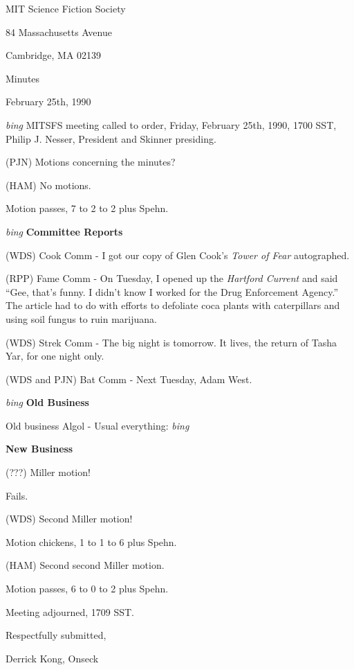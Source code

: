 \setlength{\topmargin}{-0.5in}
\setlength{\oddsidemargin}{0.0in}
\setlength{\evensidemargin}{0.0in}
\setlength{\textheight}{9in}
\setlength{\textwidth}{6.5in}



\begin{center}
MIT Science Fiction Society

84 Massachusetts Avenue

Cambridge, MA 02139

\vspace{0.2in}
Minutes

February 25th, 1990

\end{center}
 
\vspace{0.15in}
{\em bing\/}  MITSFS meeting called to order, Friday, February 25th, 1990,
1700 SST, Philip J. Nesser, President and Skinner presiding.

(PJN) Motions concerning the minutes?

(HAM) No motions.

Motion passes, 7 to 2 to 2 plus Spehn.

\vspace{0.15in}
{\em bing\/} {\bf Committee Reports}

(WDS) Cook Comm - I got our copy of Glen Cook's {\em Tower of Fear}
autographed.

(RPP) Fame Comm - On Tuesday, I opened up the {\em Hartford Current}
and said ``Gee, that's funny.  I didn't know I worked for the Drug
Enforcement Agency.''  The article had to do with efforts to defoliate
coca plants with caterpillars and using soil fungus to ruin marijuana.

(WDS) Strek Comm - The big night is tomorrow.  It lives, the return of
Tasha Yar, for one night only.

(WDS and PJN) Bat Comm - Next Tuesday, Adam West.

\vspace{0.15in}
{\em bing\/} {\bf Old Business}

Old business Algol - Usual everything: {\em bing\/}

\vspace{0.15in}
{\bf New Business}

(???) Miller motion!

Fails.

(WDS) Second Miller motion!

Motion chickens, 1 to 1 to 6 plus Spehn.

(HAM) Second second Miller motion.

Motion passes, 6 to 0 to 2 plus Spehn.

Meeting adjourned, 1709 SST.

\vspace{0.15in}
\begin{center}
Respectfully submitted,

Derrick Kong, Onseck
\end{center}

